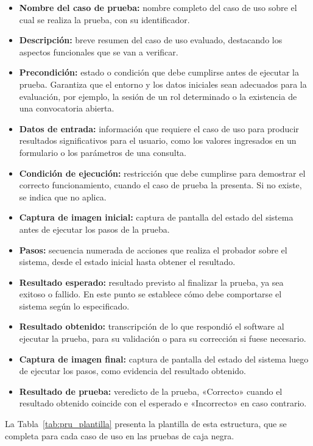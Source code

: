 \begin{itemize}
    \item \textbf{Nombre del caso de prueba:} nombre completo del caso de uso sobre el cual se realiza la prueba, con su identificador.
    \item \textbf{Descripción:} breve resumen del caso de uso evaluado, destacando los aspectos funcionales que se van a verificar.
    \item \textbf{Precondición:} estado o condición que debe cumplirse antes de ejecutar la prueba. Garantiza que el entorno y los datos iniciales sean adecuados para la evaluación, por ejemplo, la sesión de un rol determinado o la existencia de una convocatoria abierta.
    \item \textbf{Datos de entrada:} información que requiere el caso de uso para producir resultados significativos para el usuario, como los valores ingresados en un formulario o los parámetros de una consulta.
    \item \textbf{Condición de ejecución:} restricción que debe cumplirse para demostrar el correcto funcionamiento, cuando el caso de prueba la presenta. Si no existe, se indica que no aplica.
    \item \textbf{Captura de imagen inicial:} captura de pantalla del estado del sistema antes de ejecutar los pasos de la prueba.
    \item \textbf{Pasos:} secuencia numerada de acciones que realiza el probador sobre el sistema, desde el estado inicial hasta obtener el resultado.
    \item \textbf{Resultado esperado:} resultado previsto al finalizar la prueba, ya sea exitoso o fallido. En este punto se establece cómo debe comportarse el sistema según lo especificado.
    \item \textbf{Resultado obtenido:} transcripción de lo que respondió el software al ejecutar la prueba, para su validación o para su corrección si fuese necesario.
    \item \textbf{Captura de imagen final:} captura de pantalla del estado del sistema luego de ejecutar los pasos, como evidencia del resultado obtenido.
    \item \textbf{Resultado de prueba:} veredicto de la prueba, «Correcto» cuando el resultado obtenido coincide con el esperado e «Incorrecto» en caso contrario.
\end{itemize}

La Tabla~\ref{tab:pru_plantilla} presenta la plantilla de esta estructura, que se completa para cada caso de uso en las pruebas de caja negra.

